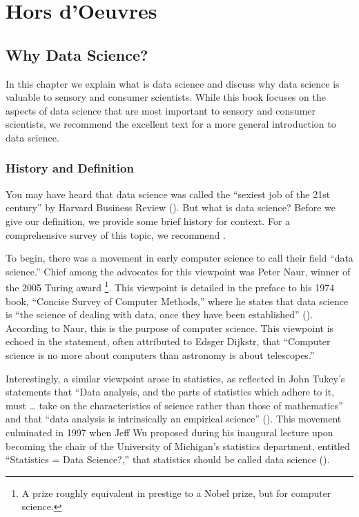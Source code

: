 \documentclass[
]{book}
\begin{document}
\hypertarget{part-hors-doeuvres}{%
\part*{Hors d'Oeuvres}\label{part-hors-doeuvres}}

\hypertarget{data_science}{%
\chapter{Why Data Science?}\label{data_science}}

In this chapter we explain what is data science and discuss why data science is valuable to sensory and consumer scientists. While this book focuses on the aspects of data science that are most important to sensory and consumer scientists, we recommend the excellent text \citet{Wickham2016} for a more general introduction to data science.

\hypertarget{history-and-definition}{%
\section{History and Definition}\label{history-and-definition}}

You may have heard that data science was called the ``sexiest job of the 21st century'' by Harvard Business Review (\citet{Davenport2012}). But what is data science? Before we give our definition, we provide some brief history for context. For a comprehensive survey of this topic, we recommend \citet{Cao2017}.

To begin, there was a movement in early computer science to call their field ``data science.'' Chief among the advocates for this viewpoint was Peter Naur, winner of the 2005 Turing award \footnote{A prize roughly equivalent in prestige to a Nobel prize, but for computer science.}. This viewpoint is detailed in the preface to his 1974 book, ``Concise Survey of Computer Methods,'' where he states that data science is ``the science of dealing with data, once they have been established'' (\citet{Naur1974}). According to Naur, this is the purpose of computer science. This viewpoint is echoed in the statement, often attributed to Edsger Dijkstr, that ``Computer science is no more about computers than astronomy is about telescopes.''

Interestingly, a similar viewpoint arose in statistics, as reflected in John Tukey's statements that ``Data analysis, and the parts of statistics which adhere to it, must \ldots{} take on the characteristics of science rather than those of mathematics'' and that ``data analysis is intrinsically an empirical science'' (\citet{Tukey1962}). This movement culminated in 1997 when Jeff Wu proposed during his inaugural lecture upon becoming the chair of the University of Michigan's statistics department, entitled ``Statistics = Data Science?,'' that statistics should be called data science (\citet{Wu1997}).
\end{document}
